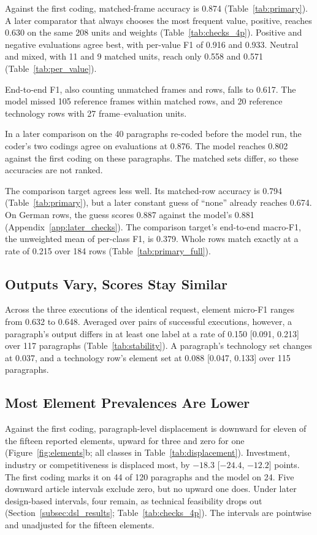Against the first coding, matched-frame accuracy is 0.874 (Table~\ref{tab:primary}). A later comparator that always chooses the most frequent value, positive, reaches 0.630 on the same 208 units and weights (Table~\ref{tab:checks_4p}). Positive and negative evaluations agree best, with per-value F1 of 0.916 and 0.933. Neutral and mixed, with 11 and 9 matched units, reach only 0.558 and 0.571 (Table~\ref{tab:per_value}).

End-to-end F1, also counting unmatched frames and rows, falls to 0.617. The model missed 105 reference frames within matched rows, and 20 reference technology rows with 27 frame--evaluation units.

In a later comparison on the 40 paragraphs re-coded before the model run, the coder's two codings agree on evaluations at 0.876. The model reaches 0.802 against the first coding on these paragraphs. The matched sets differ, so these accuracies are not ranked.

The comparison target agrees less well. Its matched-row accuracy is 0.794 (Table~\ref{tab:primary}), but a later constant guess of ``none'' already reaches 0.674. On German rows, the guess scores 0.887 against the model's 0.881 (Appendix~\ref{app:later_checks}). The comparison target's end-to-end macro-F1, the unweighted mean of per-class F1, is 0.379. Whole rows match exactly at a rate of 0.215 over 184 rows (Table~\ref{tab:primary_full}).

\subsection{Outputs Vary, Scores Stay Similar}\label{subsec:stability_results}

Across the three executions of the identical request, element micro-F1 ranges from 0.632 to 0.648. Averaged over pairs of successful executions, however, a paragraph's output differs in at least one label at a rate of 0.150 [0.091, 0.213] over 117 paragraphs (Table~\ref{tab:stability}). A paragraph's technology set changes at 0.037, and a technology row's element set at 0.088 [0.047, 0.133] over 115 paragraphs.

\subsection{Most Element Prevalences Are Lower}\label{subsec:displacement_results}



Against the first coding, paragraph-level displacement is downward for eleven of the fifteen reported elements, upward for three and zero for one (Figure~\ref{fig:elements}b; all classes in Table~\ref{tab:displacement}). Investment, industry or competitiveness is displaced most, by $-18.3$ [$-24.4$, $-12.2$] points. The first coding marks it on 44 of 120 paragraphs and the model on 24. Five downward article intervals exclude zero, but no upward one does. Under later design-based intervals, four remain, as technical feasibility drops out (Section~\ref{subsec:dsl_results}; Table~\ref{tab:checks_4p}). The intervals are pointwise and unadjusted for the fifteen elements.


